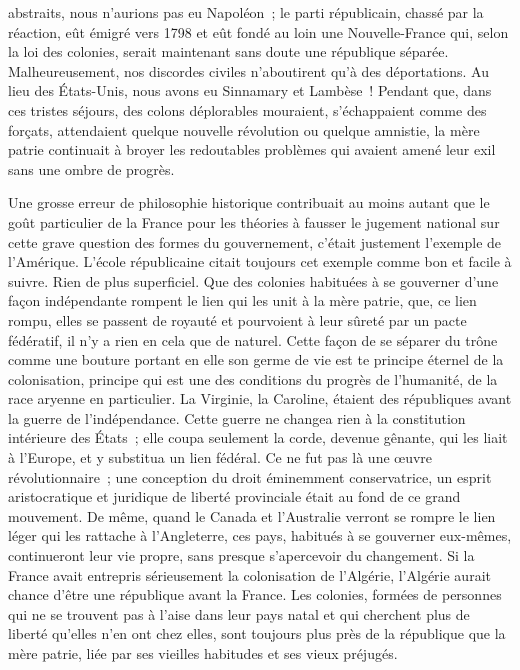 \documentclass[french,twoside]{book} %
\begin{document}
abstraits, nous n’aurions pas eu Napoléon ; le parti républicain, chassé par la réaction, eût émigré vers 1798 et eût fondé au loin une Nouvelle-France qui, selon la loi des colonies, serait maintenant sans doute une république séparée. Malheureusement, nos discordes civiles n’aboutirent qu’à des déportations. Au lieu des États-Unis, nous avons eu Sinnamary et Lambèse ! Pendant que, dans ces tristes séjours, des colons déplorables mouraient, s’échappaient comme des forçats, attendaient quelque nouvelle révolution ou quelque amnistie, la mère patrie continuait à broyer les redoutables problèmes qui avaient amené leur exil sans une ombre de progrès.\par
Une grosse erreur de philosophie historique contribuait au moins autant que le goût particulier de la France pour les théories à fausser le jugement national sur cette grave question des formes du gouvernement, c’était justement l’exemple de l’Amérique. L’école républicaine citait toujours cet exemple comme bon et facile à suivre. Rien de plus superficiel. Que des colonies habituées à se gouverner d’une façon indépendante rompent le lien qui les unit à la mère patrie, que, ce lien rompu, elles se passent de royauté et pourvoient à leur sûreté par un pacte fédératif, il n’y a rien en cela que de naturel. Cette façon de se séparer du trône comme une bouture portant en elle son germe de vie est te principe éternel de la colonisation, principe qui est une des conditions du progrès de l’humanité, de la race aryenne en particulier. La Virginie, la Caroline, étaient des républiques avant la guerre de l’indépendance. Cette guerre ne changea rien à la constitution intérieure des États ; elle coupa seulement la corde, devenue gênante, qui les liait à l’Europe, et y substitua un lien fédéral. Ce ne fut pas là une œuvre révolutionnaire ; une conception du droit éminemment conservatrice, un esprit aristocratique et juridique de liberté provinciale était au fond de ce grand mouvement. De même, quand le Canada et l’Australie verront se rompre le lien léger qui les rattache à l’Angleterre, ces pays, habitués à se gouverner eux-mêmes, continueront leur vie propre, sans presque s’apercevoir du changement. Si la France avait entrepris sérieusement la colonisation de l’Algérie, l’Algérie aurait chance d’être une république avant la France. Les colonies, formées de personnes qui ne se trouvent pas à l’aise dans leur pays natal et qui cherchent plus de liberté qu’elles n’en ont chez elles, sont toujours plus près de la république que la mère patrie, liée par ses vieilles habitudes et ses vieux préjugés.\par
\end{document}

